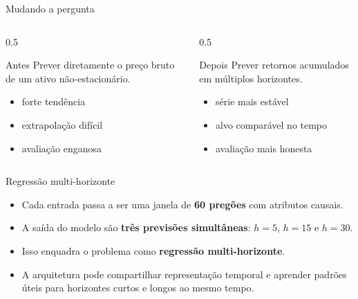 \documentclass{libs/ufc_format}
\begin{document}
\begin{frame}{Mudando a pergunta}
    \begin{columns}
        \begin{column}{0.5\textwidth}
            \begin{block}{Antes}
                Prever diretamente o preço bruto de um ativo não-estacionário.
            \end{block}

            \vspace{0.3cm}
            \begin{itemize}
                \item forte tendência
                \item extrapolação difícil
                \item avaliação enganosa
            \end{itemize}
        \end{column}
        \begin{column}{0.5\textwidth}
            \begin{exampleblock}{Depois}
                Prever retornos acumulados em múltiplos horizontes.
            \end{exampleblock}

            \vspace{0.3cm}
            \begin{itemize}
                \item série mais estável
                \item alvo comparável no tempo
                \item avaliação mais honesta
            \end{itemize}
        \end{column}
    \end{columns}
\end{frame}

\begin{frame}{Regressão multi-horizonte}
    \begin{itemize}
        \item Cada entrada passa a ser uma janela de \textbf{60 pregões} com atributos causais.
        \item A saída do modelo são \textbf{três previsões simultâneas}: $h=5$, $h=15$ e $h=30$.
        \item Isso enquadra o problema como \textbf{regressão multi-horizonte}.
        \item A arquitetura pode compartilhar representação temporal e aprender padrões úteis para horizontes curtos e longos ao mesmo tempo.
    \end{itemize}

    \vspace{0.3cm}
\end{frame}
\end{document}
